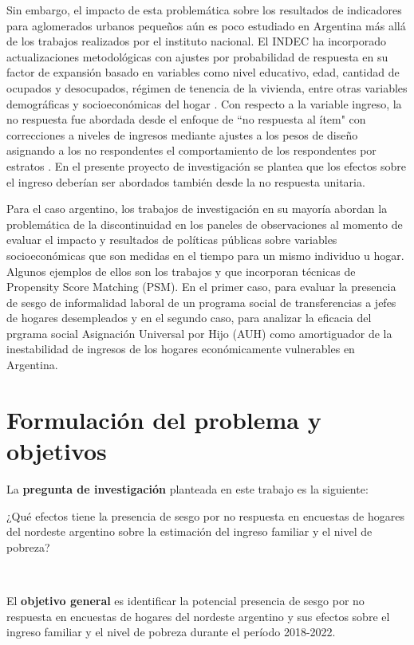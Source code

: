 \documentclass{article}
\begin{document}
Sin embargo, el impacto de esta problemática sobre los resultados de indicadores para aglomerados urbanos pequeños aún es poco estudiado en Argentina más allá de los trabajos realizados por el instituto nacional. El INDEC ha incorporado actualizaciones metodológicas con ajustes por probabilidad de respuesta en su factor de expansión basado en variables como nivel educativo, edad, cantidad de ocupados y desocupados, régimen de tenencia de la vivienda, entre otras variables demográficas y socioeconómicas del hogar \cite{indecmetod}. Con respecto a la variable ingreso, la no respuesta fue abordada desde el enfoque de ``no respuesta al ítem" con correcciones a niveles de ingresos mediante ajustes a los pesos de diseño asignando a los no respondentes el comportamiento de los respondentes por estratos \cite{indecmetod2}. En el presente proyecto de investigación se plantea que los efectos sobre el ingreso deberían ser abordados también desde la no respuesta unitaria.

Para el caso argentino, los trabajos de investigación en su mayoría abordan la problemática de la discontinuidad en los paneles de observaciones al momento de evaluar el impacto y resultados de políticas públicas sobre variables socioeconómicas que son medidas en el tiempo para un mismo individuo u hogar. Algunos ejemplos de ellos son los trabajos \cite{psm_gasparini} y \cite{auh_psm} que incorporan técnicas de Propensity Score Matching (PSM). En el primer caso, para evaluar la presencia de sesgo de informalidad laboral de un programa social de transferencias a jefes de hogares desempleados y en el segundo caso, para analizar la eficacia del prgrama social Asignación Universal por Hijo (AUH) como amortiguador de la inestabilidad de ingresos de los hogares económicamente vulnerables en Argentina.

\section{Formulación del problema y objetivos}

La \textbf{pregunta de investigación} planteada en este trabajo es la siguiente:

¿Qué efectos tiene la presencia de sesgo por no respuesta en encuestas de hogares del nordeste argentino sobre la estimación del ingreso familiar y el nivel de pobreza?

\

El \textbf{objetivo general} es identificar la potencial presencia de sesgo por no respuesta en encuestas de hogares del nordeste argentino y sus efectos sobre el ingreso familiar y el nivel de pobreza durante el período 2018-2022.
\end{document}
